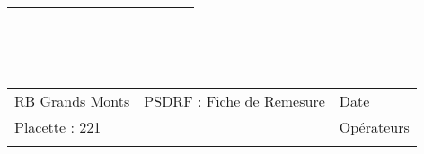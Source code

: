 \documentclass[a4paper, landscape]{article}\usepackage[]{graphicx}\usepackage[]{color}
\begin{document}
{\begin{tabular}{|p{1cm}|p{2cm}|p{1.6cm}|p{1.6cm}|p{1.6cm}|p{1.6cm}|p{1.5cm}|p{1.5cm}|p{1.5cm}|p{1.5cm}|p{1.5cm}|p{7.5cm}|p{5cm}|}
   \hline
 &  &  &  &  &  &  &  &  &  &  &  &  \\ 
   \rowcolor[gray]{0.95} \hline
 &  &  &  &  &  &  &  &  &  &  &  &  \\ 
   \hline
 &  &  &  &  &  &  &  &  &  &  &  &  \\ 
   \rowcolor[gray]{0.95} \hline
 &  &  &  &  &  &  &  &  &  &  &  &  \\ 
   \hline
 &  &  &  &  &  &  &  &  &  &  &  &  \\ 
   \rowcolor[gray]{0.95} \hline
 &  &  &  &  &  &  &  &  &  &  &  &  \\ 
   \hline
 &  &  &  &  &  &  &  &  &  &  &  &  \\ 
   \rowcolor[gray]{0.95} \hline
 &  &  &  &  &  &  &  &  &  &  &  &  \\ 
   \hline
 &  &  &  &  &  &  &  &  &  &  &  &  \\ 
   \rowcolor[gray]{0.95} \hline
 &  &  &  &  &  &  &  &  &  &  &  &  \\ 
   \hline
 &  &  &  &  &  &  &  &  &  &  &  &  \\ 
   \rowcolor[gray]{0.95} \hline
 &  &  &  &  &  &  &  &  &  &  &  &  \\ 
   \hline
\end{tabular}
}

\begin{tabular}{p{10cm}p{10cm}p{8cm}}
  RB Grands Monts & PSDRF : Fiche de Remesure & Date \\ 
  Placette : 221 &  & Opérateurs \\ 
   &  &  \\ 
  \end{tabular}
\end{document}
